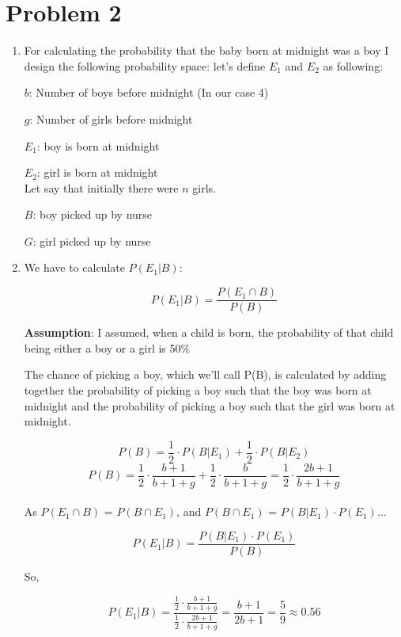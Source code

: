 	\newpage
	\section*{Problem 2}\label{sec:prob-2}
	\begin{enumerate}
	\item For calculating the probability that the baby born at midnight was a boy I design the following probability space:
	 let's define $ E_{1} $ and $ E_{2} $ as following:
	 
	 $ b $: Number of boys before midnight (In our case 4)
	 
	 $ g $: Number of girls before midnight
	 
	 $ E_{1} $: boy is born at midnight
	 
	 $ E_{2} $: girl is born at midnight\\
	
	Let say that initially there were $ n $ girls.
	
	$ B $: boy picked up by nurse
	
	$ G $: girl picked up by nurse\\
	
	\item We have to calculate $ P(E_{1}|B) $:
	
	\[
	P(E_{1}|B) = \frac{P(E_{1} \cap B)}{P(B)}
	\]
	
	\textbf{Assumption}: I assumed, when a child is born, the probability of that child being either a boy or a girl is 50\%
	
	The chance of picking a boy, which we'll call P(B), is calculated by adding together the probability of picking a boy such that the boy was born at midnight and the probability of picking a boy such that the girl was born at midnight.
	
	\[
	P(B) = \frac{1}{2} \cdot P(B|E_{1}) + \frac{1}{2} \cdot P(B|E_{2}) 
	\]
	\[
	P(B) = \frac{1}{2} \cdot \frac{b + 1}{b + 1 + g} + \frac{1}{2} \cdot \frac{b}{b + 1 + g} = \frac{1}{2} \cdot \frac{2b + 1}{b + 1 + g}
	\]\\
	
	As $ P(E_{1} \cap B) $ = $ P(B \cap E_{1}) $, and  $ P(B \cap E_{1}) $ = $ P(B | E_{1}) \cdot  P(E_{1}) \dots$
	
	\[
	P(E_{1}|B) = \frac{P(B | E_{1}) \cdot  P(E_{1})}{P(B)}
	\]
	
	So,
	
	\[
	P(E_{1}|B) = \frac{\frac{1}{2} \cdot \frac{b + 1}{b + 1 + g}}{\frac{1}{2} \cdot \frac{2b + 1}{b + 1 + g}} = \frac{b + 1}{2b + 1} = \frac{5}{9} \approx 0.56
	\]
	
	\end{enumerate}

